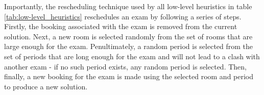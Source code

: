 Importantly, the rescheduling technique used by all low-level heuristics in table \ref{tab:low-level_heuristics} reschedules an exam by following a series of steps. Firstly, the booking associated with the exam is removed from the current solution. Next, a new room is selected randomly from the set of rooms that are large enough for the exam. Penultimately, a random period is selected from the set of periods that are long enough for the exam and will not lead to a clash with another exam - if no such period exists, any random period is selected. Then, finally, a new booking for the exam is made using the selected room and period to produce a new solution.